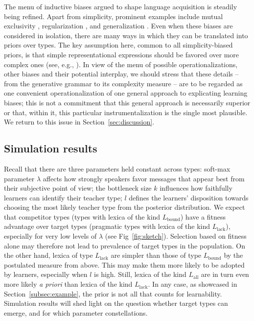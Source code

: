 \documentclass[a4paper, 11pt]{article}
\theoremstyle{Satz}
\newcommand{\mylang}[1]{\ensuremath{L_{\text{#1}}}\xspace} %
\newcommand{\Lall}{\mylang{all}}
\newcommand{\Lbound}{\mylang{bound}}
\newcommand{\Llack}{\mylang{lack}}
\begin{document}
The menu of inductive biases argued to shape language acquisition is steadily being refined. Apart from simplicity, prominent examples include mutual exclusivity \citep{merriman+bowman:1989,clark:2009}, regularization \citep{hudson+etal:2005}, and generalization \citep{smith:2011}. Even when these biases are considered in isolation, there are many ways in which they can be translated into priors over types. The key assumption here, common to all simplicity-biased priors, is that simple representational expressions should be favored over more complex ones (see, e.g., \citealt{goodman+etal:2008, piantadosi+etal:2012a, kirby+etal:2015}). In view of the menu of possible operationalizations, other biases and their potential interplay, we should stress that these details -- from the generative grammar to its complexity measure -- are to be regarded as one convenient operationalization of one general approach to explicating learning biases; this is not a commitment that this general approach is necessarily superior or that, within it, this particular instrumentalization is the single most plausible. We return to this issue in Section~\ref{sec:discussion}.


\subsection{Simulation results}
\label{sec:simulation-results}
Recall that there are three parameters held constant across types: soft-max parameter $\lambda$ affects how strongly
speakers favor messages that appear best from their subjective point of view; the
bottleneck size $k$ influences how faithfully learners can identify their teacher type; $l$
defines the learners' disposition towards choosing the most likely teacher type from the
posterior distribution. We expect that competitor types (types with lexica of the kind
$\Lbound$) have a fitness advantage over target types (pragmatic types with lexica of the kind
$\Llack$), especially for very low levels of $\lambda$ (see Fig~\ref{fig:sketch}). Selection based on fitness alone may
therefore not lead to prevalence of target types in the population. On the other hand, lexica
of type $\Llack$ are simpler than those of type $\Lbound$ by the postulated measure from
above. This may make them more likely to be adopted by learners, especially when $l$ is high. Still, lexica of the kind $\Lall$ are in turn even more likely \emph{a priori} than lexica of the kind $\Llack$. In any case, as showcased in Section~\ref{subsec:example}, the prior is not all that counts for learnability. Simulation results will shed light on the question whether target
types can emerge, and for which parameter constellations.
\end{document}
